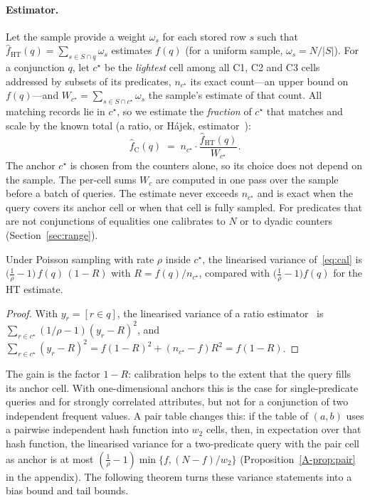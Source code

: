 \documentclass[sigconf]{acmart}
\begin{document}
\paragraph{Estimator.} Let the sample provide a weight $\omega_s$ for each stored row $s$ such that
$\hat f_{\mathrm{HT}}(q)=\sum_{s\in S\cap q}\omega_s$ estimates $f(q)$ (for a uniform sample,
$\omega_s=N/|S|$). For a conjunction $q$, let $c^\star$ be the \emph{lightest} cell among all C1, C2
and C3 cells addressed by subsets of its predicates, $n_{c^\star}$ its exact count---an upper bound on
$f(q)$---and $W_{c^\star}=\sum_{s\in S\cap c^\star}\omega_s$ the sample's estimate of that count. All
matching records lie in $c^\star$, so we estimate the \emph{fraction} of $c^\star$ that matches and
scale by the known total (a ratio, or H\'ajek, estimator~\cite{sarndal}):
\begin{equation}\label{eq:cal}
  \hat f_{\mathrm{C}}(q) \;=\; n_{c^\star}\cdot\frac{\hat f_{\mathrm{HT}}(q)}{W_{c^\star}} .
\end{equation}
The anchor $c^\star$ is chosen from the counters alone, so its choice does not depend on the sample. The
per-cell sums $W_c$ are computed in one pass over the sample before a batch of queries. The estimate
never exceeds $n_{c^\star}$ and is exact when the query covers its anchor cell or when that cell is fully
sampled. For predicates that are not conjunctions of equalities one calibrates to $N$ or to dyadic
counters (Section~\ref{sec:range}).

\begin{proposition}\label{prop:calvar}
Under Poisson sampling with rate $\rho$ inside $c^\star$, the linearised variance of~\eqref{eq:cal} is
$\bigl(\tfrac1\rho-1\bigr)\,f(q)\,(1-R)$ with $R=f(q)/n_{c^\star}$, compared with
$\bigl(\tfrac1\rho-1\bigr)f(q)$ for the HT estimate.
\end{proposition}
\begin{proof}
With $y_r=[r\in q]$, the linearised variance of a ratio estimator~\cite{sarndal} is
$\sum_{r\in c^\star}(1/\rho-1)(y_r-R)^2$, and $\sum_{r\in c^\star}(y_r-R)^2=f(1-R)^2+(n_{c^\star}-f)R^2=f(1-R)$.
\end{proof}
The gain is the factor $1-R$: calibration helps to the extent that the query fills its anchor cell. With
one-dimensional anchors this is the case for single-predicate queries and for strongly correlated
attributes, but not for a conjunction of two independent frequent values. A pair table changes this:
if the table of $(a,b)$ uses a pairwise independent hash function into $w_2$ cells, then, in expectation
over that hash function, the linearised variance for a two-predicate query with the pair cell as anchor
is at most $(\tfrac1\rho-1)\min\{f,(N-f)/w_2\}$ (Proposition~\ref{A-prop:pair} in the appendix). The
following theorem turns these variance statements into a bias bound and tail bounds.
\end{document}
